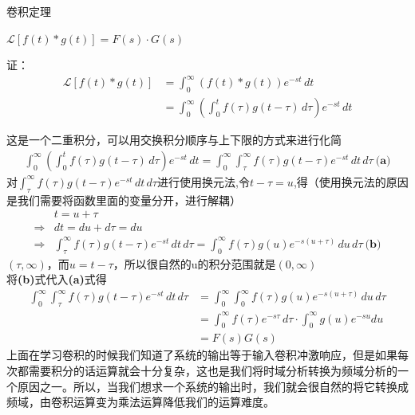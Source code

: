 \documentclass[UTF8,a4paper,12pt]{ctexart}
\begin{document}
   \begin{titlebox}{卷积定理}
    \begin{center}
      $\mathcal{L}[f(t)*g(t)] =F(s)\cdot G(s)$
    \end{center}
    证：
    \begin{align*}
      \mathcal{L}[f(t)*g(t)] &= \int_0^{\infty} \left( f(t) * g(t) \right) e^{-st} \, dt \\
                              &= \int_0^{\infty} \left( \int_0^t f(\tau) g(t - \tau) \, d\tau \right) e^{-st} \, dt
    \end{align*}
    \begin{flushleft}
      这是一个二重积分，可以用交换积分顺序与上下限的方式来进行化简
      \begin{align*}
         \int_0^{\infty} \left( \int_0^t f(\tau) g(t - \tau) \, d\tau \right) e^{-st} \, dt=\int_0^{\infty}  \int_\tau^{\infty} f(\tau) g(t - \tau) e^{-st}\, dt   \, d\tau  \  \textbf{(a)}
      \end{align*}
      对$  \int_\tau^{\infty} f(\tau) g(t - \tau) e^{-st}\, dt   \, d\tau$进行使用换元法,令$t-\tau=u$,得（使用换元法的原因是我们需要将函数里面的变量分开，进行解耦）
      \begin{align*}
         & t=u+\tau\\      
       \Rightarrow & dt=du+d\tau=du\\
       \Rightarrow  &\int_\tau^{\infty} f(\tau) g(t - \tau) e^{-st}\,   dt   \, d\tau=\int_0^{\infty} f(\tau) g(u) e^{-s(u+\tau)}\,   du   \, d\tau  \ \textbf{(b)}
      \end{align*}
        {$(\tau,\infty)$，而$u=t-\tau$，所以很自然的u的积分范围就是$(0,\infty)$}
        \\将\textbf{(b)}式代入\textbf{(a)}式得
        \begin{align*}
          \int_0^{\infty}  \int_\tau^{\infty} f(\tau) g(t - \tau) e^{-st}\,   dt   \, d\tau&=\int_0^{\infty}\int_0^{\infty} f(\tau) g(u) e^{-s(u+\tau)}\,   du   \, d\tau  \\
          &=\int_0^{\infty} f(\tau) e^{-s\tau}\,   d\tau \cdot \int_0^{\infty} g(u)e^{-su} du  \ \\
          &=F(s)G(s)
       \end{align*}
    上面在学习卷积的时候我们知道了系统的输出等于输入卷积冲激响应，但是如果每次都需要积分的话运算就会十分复杂，这也是我们将时域分析转换为频域分析的一个原因之一。所以，当我们想求一个系统的输出时，我们就会很自然的将它转换成频域，由卷积运算变为乘法运算降低我们的运算难度。
    \end{flushleft}

   \end{titlebox}
\end{document}
